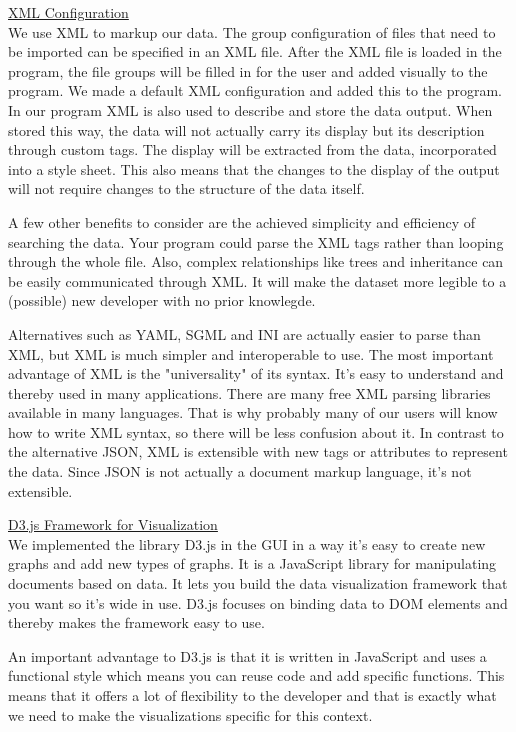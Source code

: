 \documentclass[a4paper,english,fleqn]{exam}
\begin{document}
\underline{XML Configuration} \\
We use XML to markup our data. The group configuration of files that need to be imported can be specified in an XML file. After the XML file is loaded in the program, the file groups will be filled in for the user and added visually to the program. We made a default XML configuration and added this to the program. In our program XML is also used to describe and store the data output. When stored this way, the data will not actually carry its display but its description through custom tags. The display will be extracted from the data, incorporated into a style sheet. This also means that the changes to the display of the output will not require changes to the structure of the data itself.

A few other benefits to consider are the achieved simplicity and efficiency of searching the data. Your program could parse the XML tags rather than looping through the whole file. Also, complex relationships like trees and inheritance can be easily communicated through XML. It will make the dataset more legible to a (possible) new developer with no prior knowlegde. 

Alternatives such as YAML, SGML and INI are actually easier to parse than XML, but XML is much simpler and interoperable to use. The most important advantage of XML is the "universality" of its syntax. It's easy to understand and thereby used in many applications. There are many free XML parsing libraries available in many languages. That is why probably many of our users will know how to write XML syntax, so there will be less confusion about it. 
In contrast to the alternative JSON, XML is extensible with new tags or attributes to represent the data. Since JSON is not actually a document markup language, it's not extensible. \\

\newpage 

\underline{D3.js Framework for Visualization} \\
We implemented the library D3.js in the GUI in a way it’s easy to create new graphs and add new types of graphs. It is a JavaScript library for manipulating documents based on data. It lets you build the data visualization framework that you want so it's wide in use. D3.js focuses on binding data to DOM elements and thereby makes the framework easy to use. 

An important advantage to D3.js is that it is written in JavaScript and uses a functional style which means you can reuse code and add specific functions. This means that it offers a lot of flexibility to the developer and that is exactly what we need to make the visualizations specific for this context.
\end{document}
